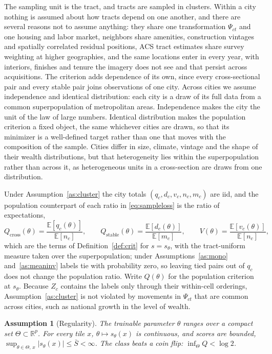 \documentclass[11pt]{article}
\newtheorem{assumption}{Assumption}
\theoremstyle{remark}
\newcommand{\E}{\mathbb{E}}
\newcommand{\Qc}{Q_{\mathrm{cross}}}
\newcommand{\Qs}{Q_{\mathrm{stable}}}
\newcommand{\Qt}{Q}
\begin{document}
The sampling unit is the tract, and tracts are sampled in clusters. Within a city nothing is assumed
about how tracts depend on one another, and there are several reasons not to assume anything: they
share one transformation $\Psi_{ct}$ and one housing and labor market, neighbors share amenities,
construction vintages and spatially correlated residual positions, ACS tract estimates share survey
weighting at higher geographies, and the same locations enter in every year, with interiors, finishes
and tenure the imagery does not see and that persist across acquisitions. The criterion adds dependence
of its own, since every cross-sectional pair and every stable pair joins observations of one city.
Across cities we assume independence and identical distribution: each city is a draw of its full data
from a common superpopulation of metropolitan areas. Independence makes the city the unit of the law of
large numbers. Identical distribution makes the population criterion a fixed object, the same whichever
cities are drawn, so that its minimizer is a well-defined target rather than one that moves with the
composition of the sample. Cities differ in size, climate, vintage and the shape of their wealth
distributions, but that heterogeneity lies within the superpopulation rather than across it, as
heterogeneous units in a cross-section are draws from one distribution.

Under Assumption~\ref{as:cluster} the city totals $(q_c, d_c, v_c, n_c, m_c)$ are iid, and the
population counterpart of each ratio in \eqref{eq:sampleloss} is the ratio of expectations,
\begin{equation}\label{eq:popratio}
    \Qc(\theta) = \frac{\E[q_c(\theta)]}{\E[n_c]},
    \qquad
    \Qs(\theta) = \frac{\E[d_c(\theta)]}{\E[m_c]},
    \qquad
    V(\theta) = \frac{\E[v_c(\theta)]}{\E[n_c]},
\end{equation}
which are the terms of Definition~\ref{def:crit} for $s = s_\theta$, with the tract-uniform measure
taken over the superpopulation; under Assumptions~\ref{as:mono} and~\ref{as:meaninv} labels tie with
probability zero, so leaving tied pairs out of $q_c$ does not change the population ratio. Write
$\Qt(\theta)$ for the population criterion at $s_\theta$. Because $Z_c$ contains the labels only through
their within-cell orderings, Assumption~\ref{as:cluster} is not violated by movements in $\Psi_{ct}$
that are common across cities, such as national growth in the level of wealth.

\begin{assumption}[Regularity]\label{as:regular}
The trainable parameter $\theta$ ranges over a compact set $\Theta \subset \mathbb{R}^{p}$. For every
tile $x$, $\theta \mapsto s_\theta(x)$ is continuous, and scores are bounded,
$\sup_{\theta\in\Theta,\,x}|s_\theta(x)| \le \bar{S} < \infty$. The class beats a coin flip:
$\inf_{\Theta}\Qt < \log 2$.
\end{assumption}
\end{document}

